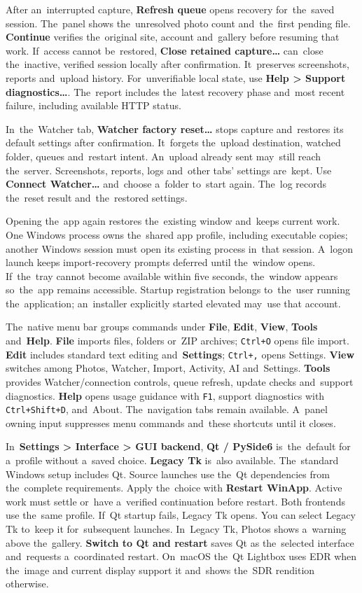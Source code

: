 \documentclass[11pt,a4paper]{article}
\newcommand{\ui}[1]{\textbf{#1}}
\begin{document}
After an~interrupted capture, \ui{Refresh queue} opens recovery for~the~saved
session. The~panel shows the~unresolved photo count and~the~first pending file.
\ui{Continue} verifies the~original site, account and~gallery before resuming
that work. If~access cannot be~restored, \ui{Close retained capture…} can~close
the~inactive, verified session locally after confirmation. It~preserves
screenshots, reports and~upload history. For~unverifiable local state, use
\ui{Help > Support diagnostics…}. The~report includes the~latest recovery phase
and~most recent failure, including available HTTP status.

In~the~Watcher tab, \ui{Watcher factory reset…} stops capture and~restores
its default settings after confirmation. It~forgets the~upload destination,
watched folder, queues and~restart intent. An~upload already sent may~still
reach the~server. Screenshots, reports, logs and~other tabs' settings are~kept.
Use \ui{Connect Watcher…} and~choose a~folder to~start again. The~log records
the~reset result and~the~restored settings.

Opening the~app again restores the~existing window and~keeps current work.
One Windows process owns the~shared app profile, including executable copies;
another Windows session must open its existing process in~that session.
A~logon launch keeps import-recovery prompts deferred until the~window opens.
If~the~tray cannot become available within five seconds, the~window appears
so~the~app remains accessible. Startup registration belongs to~the~user running
the~application; an~installer explicitly started elevated may~use that account.

The~native menu bar groups commands under \ui{File}, \ui{Edit}, \ui{View},
\ui{Tools} and~\ui{Help}. \ui{File} imports files, folders or~ZIP archives;
\texttt{Ctrl+O} opens file import. \ui{Edit} includes standard text editing
and~\ui{Settings}; \texttt{Ctrl+,} opens Settings. \ui{View} switches among
Photos, Watcher, Import, Activity, AI and~Settings. \ui{Tools} provides
Watcher/connection controls, queue refresh, update checks and~support
diagnostics. \ui{Help} opens usage guidance with \texttt{F1}, support
diagnostics with \texttt{Ctrl+Shift+D}, and~About. The~navigation tabs remain
available. A~panel owning input suppresses menu commands and~these shortcuts
until it closes.

In~\ui{Settings > Interface > GUI backend}, \ui{Qt / PySide6} is~the~default
for a~profile without a~saved choice. \ui{Legacy Tk} is~also available.
The~standard Windows setup includes Qt. Source launches use the~Qt dependencies
from the~complete requirements.
Apply the~choice with \ui{Restart WinApp}. Active work must settle or~have
a~verified continuation before restart. Both frontends use the~same profile.
If~Qt startup fails, Legacy Tk opens. You can select Legacy Tk to~keep it
for~subsequent launches. In~Legacy Tk, Photos shows a~warning above
the~gallery. \ui{Switch to Qt and restart} saves Qt as the~selected interface
and~requests a~coordinated restart.
On~macOS the~Qt Lightbox uses EDR when the~image and
current display support it and~shows the~SDR rendition otherwise.
\end{document}
